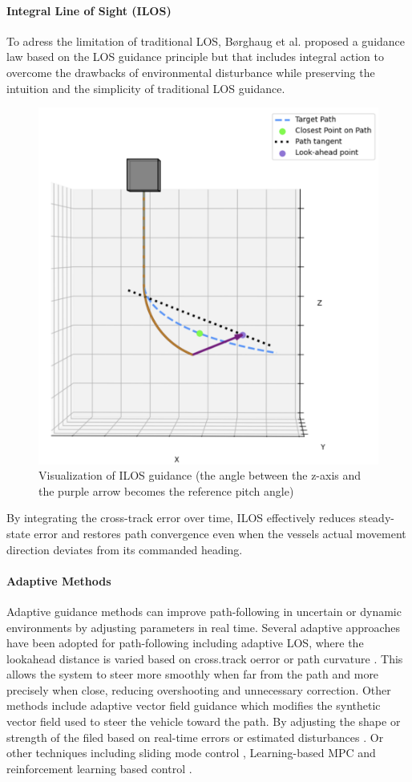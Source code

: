 \paragraph*{Integral Line of Sight (ILOS)}
To adress the limitation of traditional LOS, Børghaug et al. \cite{borhaug_integral_2008} proposed a guidance law based on the LOS guidance principle but that includes integral action to overcome the drawbacks of environmental disturbance while preserving the intuition and the simplicity of traditional LOS guidance.
\begin{figure} [H]
    \centering
    \includegraphics[width=0.7\linewidth]{images/pythonpictures/ILOS.png}
    \caption{Visualization of ILOS guidance (the angle between the z-axis and the purple arrow becomes the reference pitch angle)}
    \label{fig:ILOS}
\end{figure}
By integrating the cross-track error over time, ILOS effectively reduces steady-state error and restores path convergence even when the vessels actual movement direction deviates from its commanded heading.

\paragraph*{Adaptive Methods}
Adaptive guidance methods can improve path-following in uncertain or dynamic environments by adjusting parameters in real time. Several adaptive approaches have been adopted for path-following including adaptive LOS, where the lookahead distance is varied based on cross.track oerror or path curvature \cite{hung_review_2023}. This allows the system to steer more smoothly when far from the path and more precisely when close, reducing overshooting and unnecessary correction.
\newline \newline 
Other methods include adaptive vector field guidance which modifies the synthetic vector field used to steer the vehicle toward the path. By adjusting the shape or strength of the filed based on real-time errors or estimated disturbances \cite{soetanto_adaptive_2003}. Or other techniques including sliding mode control \cite{soetanto_adaptive_2003}, Learning-based MPC and reinforcement learning based control \cite{hung_review_2023}.

